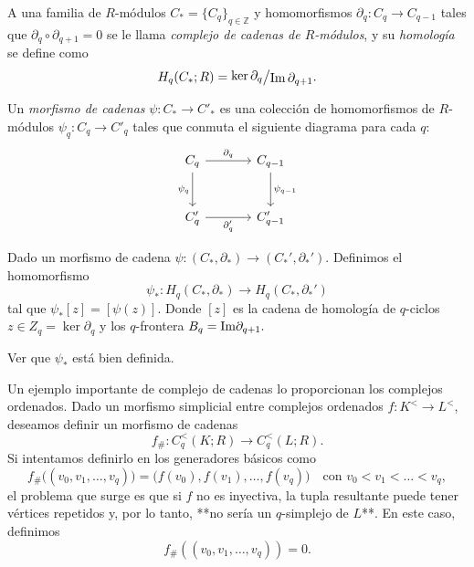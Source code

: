 \begin{definicion}
A una familia de $R$-módulos $C_* = \{C_q\}_{q \in \mathbb{Z}}$ y homomorfismos $\partial_q \colon C_q \to C_{q-1}$ tales que $\partial_q \circ \partial_{q+1} = 0$ se le llama \textit{complejo de cadenas de $R$-módulos}, y su \textit{homología} se define como
\[
H_q(C_*; R) = \raisebox{0.2ex}{$\ker \partial_q$} \big/ \raisebox{-0.2ex}{$\operatorname{Im} \partial_{q+1}$}.
\]
\end{definicion}
\begin{definicion}
Un \textit{morfismo de cadenas} $\psi \colon C_* \to C'_*$ es una colección de homomorfismos de $R$-módulos $\psi_q \colon C_q \to C'_q$ tales que conmuta el siguiente diagrama para cada $q$:
\[
\begin{tikzcd}[row sep=large, column sep=large]
C_q \arrow[r, "\partial_q"] \arrow[d, "\psi_q"'] & C_{q-1} \arrow[d, "\psi_{q-1}"] \\
C'_q \arrow[r, "\partial'_q"'] & C'_{q-1}
\end{tikzcd}
\]
\end{definicion}
\begin{definicion}
    Dado un morfismo de cadena $\psi:(C_*,\partial_*)\to(C_*',\partial_*')$. Definimos el homomorfismo
    \begin{equation*}
        \psi_*:H_q(C_*,\partial_*)\to H_q(C_*,\partial_*')
    \end{equation*}
    tal que $\psi_*[z]=[\psi(z)]$. Donde $[z]$ es la cadena de homología de $q$-ciclos $z\in Z_q=\ker\partial_q$ y los $q$-frontera $B_q=\mathrm{Im}\partial_{q+1}.$
\end{definicion}
\begin{ejercicio}
    Ver que $\psi_*$ está bien definida.
\end{ejercicio}
\begin{ejemplo}
Un ejemplo importante de complejo de cadenas lo proporcionan los complejos ordenados. Dado un morfismo simplicial entre complejos ordenados $f \colon K^< \to L^<$, deseamos definir un morfismo de cadenas
\[
f_\# \colon C_q^<(K; R) \longrightarrow C_q^<(L; R).
\]
Si intentamos definirlo en los generadores básicos como
\[
f_\#\big((v_0, v_1, \dots, v_q)\big) = \big(f(v_0), f(v_1), \dots, f(v_q)\big) \quad \text{con } v_0 < v_1 < \dots < v_q,
\]
el problema que surge es que si $f$ no es inyectiva, la tupla resultante puede tener vértices repetidos y, por lo tanto, **no sería un $q$-simplejo de $L$**. En este caso, definimos
\[
f_\#((v_0, v_1, \dots, v_q)) = 0.
\]
\end{ejemplo}
